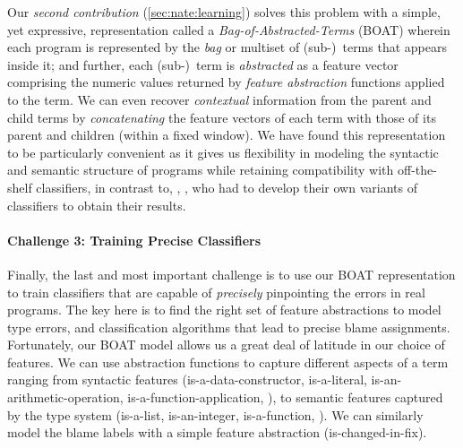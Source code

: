 Our \emph{second contribution} (\autoref{sec:nate:learning})
solves this problem with a simple, yet expressive, representation called
a \emph{Bag-of-Abstracted-Terms} (BOAT) wherein
each program is represented by the \emph{bag}
or multiset of (sub-)~terms that appears inside
it; and further, each (sub-)~term is \emph{abstracted}
as a feature vector comprising the numeric values
returned by \emph{feature abstraction} functions
applied to the term.
%
%
We can even recover \emph{contextual} information
from the parent and child terms by
\emph{concatenating} the feature vectors of each term
with those of its parent and children
(within a fixed window).
%
We have found this representation to be particularly
convenient as it gives us flexibility in modeling the
syntactic and semantic structure of programs while
retaining compatibility with off-the-shelf classifiers,
in contrast to, \eg, \citet{Raychev2015-jg}, who had
to develop their own variants of classifiers to obtain
their results.

\paragraph{Challenge 3: Training Precise Classifiers}
%
Finally, the last and most important challenge is to
use our BOAT representation to train classifiers that
are capable of \emph{precisely} pinpointing the errors
in real programs.
%
The key here is to find the right set of feature
abstractions to model type errors,
and classification algorithms that
lead to precise blame assignments.
%
Fortunately, our BOAT model allows us a great deal of
latitude in our choice of features.
%
We can use abstraction functions to capture different
aspects of a term ranging from
%
syntactic features (\eg is-a-data-constructor, is-a-literal,
is-an-arithmetic-operation, is-a-function-application, \etc),
%
to semantic features captured by the type system (\eg is-a-list,
is-an-integer, is-a-function, \etc).
%
We can similarly model the blame labels with a simple feature
abstraction (\eg is-changed-in-fix).

